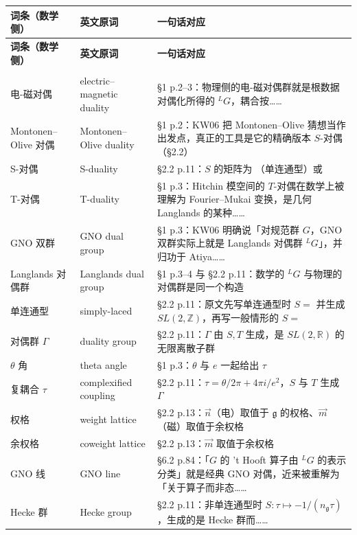 \begin{longtable}{@{}p{4.3cm}p{2.6cm}p{8.8cm}@{}}
\toprule
\bfseries 词条（数学侧） & \bfseries 英文原词 & \bfseries 一句话对应 \\
\midrule
\endfirsthead
\toprule
\bfseries 词条（数学侧） & \bfseries 英文原词 & \bfseries 一句话对应 \\
\midrule
\endhead
\bottomrule
\endlastfoot

\multicolumn{3}{@{}l}{\bfseries T1 对偶、群论与耦合常数}\\
\addlinespace[2pt]
电-磁对偶 & electric--magnetic duality & §1 p.2--3：物理侧的电-磁对偶群就是根数据对偶化所得的 ${}^LG$，耦合按…… \\
Montonen--Olive 对偶 & Montonen--Olive duality & §1 p.2：KW06 把 Montonen--Olive 猜想当作出发点，真正的工具是它的精确版本 $S$-对偶（§2.2） \\
S-对偶 & S-duality & §2.2 p.11：$S$ 的矩阵为 （单连通型）或 \\
T-对偶 & T-duality & §1 p.3：Hitchin 模空间的 $T$-对偶在数学上被理解为 Fourier--Mukai 变换，是几何 Langlands 的某种…… \\
GNO 双群 & GNO dual group & §1 p.3：KW06 明确说「对规范群 $G$，GNO 双群实际上就是 Langlands 对偶群 ${}^LG$」，并归功于 Atiya…… \\
Langlands 对偶群 & Langlands dual group & §1 p.3--4 与 §2.2 p.11：数学的 ${}^LG$ 与物理的对偶群是同一个构造 \\
单连通型 & simply-laced & §2.2 p.11：原文先写单连通型时 $S= $ 并生成 $SL(2,\mathbb Z)$，再写一般情形的 $S= $ \\
对偶群 $\Gamma$ & duality group & §2.2 p.11：$\Gamma$ 由 $S,T$ 生成，是 $SL(2,\mathbb R)$ 的无限离散子群 \\
$\theta$ 角 & theta angle & §1 p.3：$\theta$ 与 $e$ 一起给出 $\tau$ \\
复耦合 $\tau$ & complexified coupling & §2.2 p.11：$\tau=\theta/2\pi+4\pi i/e^2$，$S$ 与 $T$ 生成 $\Gamma$ \\
权格 & weight lattice & §2.2 p.13：$\vec n$（电）取值于 $\mathfrak g$ 的权格、$\vec m$（磁）取值于余权格 \\
余权格 & coweight lattice & §2.2 p.13：$\vec m$ 取值于余权格 \\
GNO 线 & GNO line & §6.2 p.84：「$G$ 的 't Hooft 算子由 ${}^LG$ 的表示分类」就是经典 GNO 对偶，近来被重解为「关于算子而非态…… \\
Hecke 群 & Hecke group & §2.2 p.11：非单连通型时 $S:\tau\mapsto-1/(n_{\mathfrak g}\tau)$，生成的是 Hecke 群而…… \\

\end{longtable}
